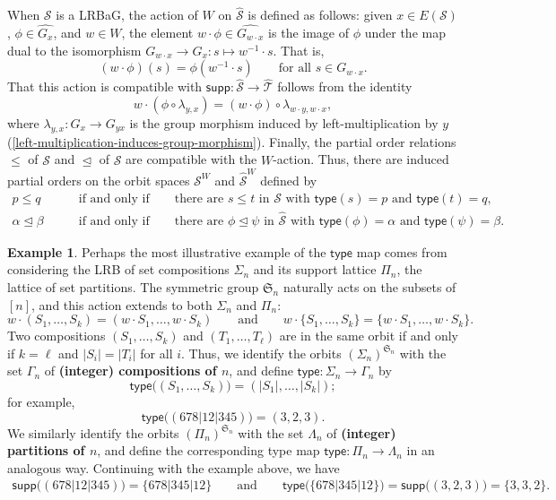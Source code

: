 \documentclass[11pt, oneside, reqno]{amsart}
\theoremstyle{definition}
\newtheorem{example}[theorem]{Example}
\numberwithin{equation}{section}
\newcommand{\defn}[1]{{\color{RoyalBlue}\bf#1}}
\def \SS{{\mathcal{S}}}
\def \TT{{\mathcal{T}}}
\def \sym{\mathfrak{S}}
\def \wh{\widehat}
\DeclareMathOperator{\chleq}{\unlhd}
\def\qqiff{\qquad\text{if and only if}\qquad}
\def\qqand{\qquad\text{and}\qquad}
\def \supp{\mathsf{supp}}
\def \type{\mathsf{type}}
\begin{document}
When $\SS$ is a LRBaG,
the action of $W$ on $\wh{\SS}$ is defined as follows: given $x \in E(\SS)$, $\phi \in \wh{G_x}$, and $w \in W$, the element $w \cdot \phi \in \wh{G_{w \cdot x}}$ is the image of $\phi$ under the map dual to the isomorphism $G_{w \cdot x} \to G_x : s \mapsto w^{-1} \cdot s$.
That is,
\[
    (w \cdot \phi)(s) = \phi(w^{-1} \cdot s) \qquad\text{for all } s \in G_{w \cdot x}.
\]
That this action is compatible with $\supp: \wh{\SS} \to \wh{\TT}$ follows from the identity
\[
    w \cdot (\phi \circ \lambda_{y,x}) = (w \cdot \phi) \circ \lambda_{w \cdot y , w \cdot x},
\]
where $\lambda_{y, x} : G_{x} \to G_{yx}$ is the group morphism
induced by left-multiplication by $y$ (\cref{left-multiplication-induces-group-morphism}).
Finally, the partial order relations $\leq$ of $\SS$ and $\chleq$ of $\wh{\SS}$ are compatible with the $W$-action.
Thus, there are induced partial orders on the orbit spaces $\SS^W$ and $\wh{\SS}^W$ defined by
\begin{align*}
    p \leq q &\qqiff \text{there are $s \leq t$ in $\SS$ with $\type(s) = p$ and $\type(t) = q$},\\
    \alpha \chleq \beta &\qqiff \text{there are $\phi \chleq \psi$ in $\wh{\SS}$ with $\type(\phi) = \alpha$ and $\type(\psi) = \beta$}.
\end{align*}

\begin{example}\label{ex:braidtype}
    Perhaps the most illustrative example of the $\type$ map comes from considering the LRB of set compositions $\Sigma_n$ and its support lattice $\Pi_n$, the lattice of set partitions. The symmetric group $\sym_n$ naturally acts on the subsets of $[n]$, and this action extends to both $\Sigma_n$ and $\Pi_n$:
    \[
        w \cdot ( S_1 , \dots , S_k ) = ( w \cdot S_1 , \dots , w \cdot S_k )
        \qqand
        w \cdot \{ S_1 , \dots , S_k \} = \{ w \cdot S_1 , \dots , w \cdot S_k \}.
    \]
    Two compositions $( S_1 , \dots , S_k )$ and $( T_1 , \dots , T_\ell )$ are in the same orbit if and only if $k = \ell$ and $|S_i| = |T_i|$ for all $i$.
    Thus, we identify the orbits $(\Sigma_n)^{\sym_n}$ with the set $\Gamma_n$ of \defn{(integer) compositions of $n$},
    and define $\type : \Sigma_n \to \Gamma_n$ by
    \begin{equation*}
        \type\big(( S_1 , \dots , S_k )\big) = ( |S_1| , \dots , |S_k| );
    \end{equation*}
    for example,
    \[ \type\big( (678 | 12 | 345) \big) = (3,2,3). \]
    We similarly identify the orbits $(\Pi_n)^{\sym_n}$ with the set $\Lambda_n$ of \defn{(integer) partitions of $n$}, and define the corresponding type map $\type : \Pi_n \to \Lambda_n$ in an analogous way.
    Continuing with the example above, we have
    \begin{align*}
        \supp\big( (678 | 12 | 345)\big) = \{ 678 | 345 | 12 \}
        \qqand
        \type\big(\{ 678 | 345 | 12 \}\big) = \supp\big((3,2,3)\big) = \{3, 3, 2\}.
    \end{align*}
\end{example}
\end{document}

